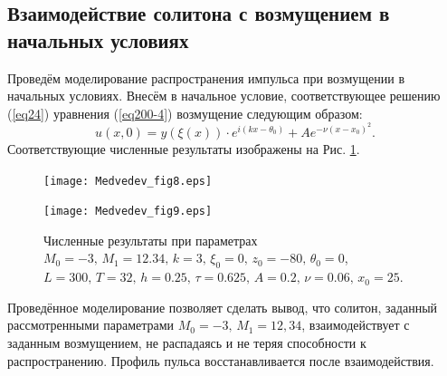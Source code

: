 \documentclass[12pt,a4paper]{article}
\begin{document}
\subsection{Взаимодействие солитона с возмущением в начальных условиях}\label{ch320}
	Проведём моделирование распространения импульса при возмущении в начальных условиях. Внесём в начальное условие, соответствующее решению (\ref{eq24}) уравнения (\ref{eq200-4}) возмущение следующим образом:
	\begin{equation} \label{eq52}
		u(x,0)=y\left(\xi\left(x\right)\right)\cdot e^{i(kx-\theta_{0})}+Ae^{-\nu(x-x_{0})^{2}}.
	\end{equation}
	Соответствующие численные результаты изображены на Рис. \ref{fig17}.
	\begin{figure}[H] %
		\begin{center}
			\begin{minipage}[h]{0.48\linewidth}
				\texttt{[image: Medvedev\_fig8.eps]}
			\end{minipage}
			\hfill
			\begin{minipage}[h]{0.48\linewidth}
				\texttt{[image: Medvedev\_fig9.eps]}
			\end{minipage}
		\end{center}
		\caption{Численные результаты при параметрах \(M_{0}=-3,\,M_{1}=12.34,\, k=3,\, \xi_{0}=0,\,z_{0}=-80,\, \theta_{0}=0\), \\
		\(L=300,\, T=32,\, h=0.25,\, \tau=0.625,\,A=0.2,\,\nu=0.06,\, x_{0}=25\).}
		\label{fig17}
	\end{figure}
	Проведённое моделирование позволяет сделать вывод, что солитон, заданный рассмотренными параметрами \(M_{0}=-3,\,M_{1}=12,34\), взаимодействует с заданным возмущением, не распадаясь и не теряя способности к распространению. Профиль пульса восстанавливается после взаимодействия.
\end{document}
